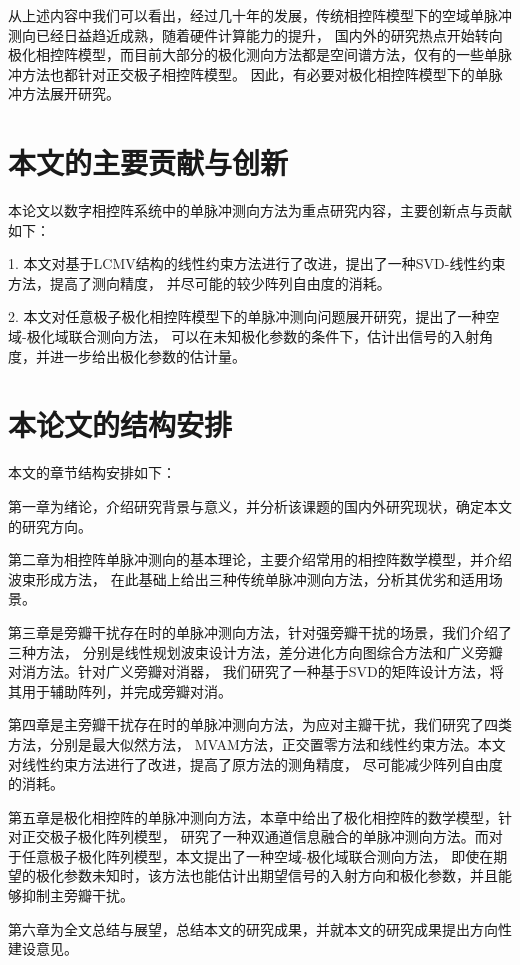 \documentclass[master]{thesis-uestc}
\begin{document}
从上述内容中我们可以看出，经过几十年的发展，传统相控阵模型下的空域单脉冲测向已经日益趋近成熟，随着硬件计算能力的提升，
国内外的研究热点开始转向极化相控阵模型，而目前大部分的极化测向方法都是空间谱方法，仅有的一些单脉冲方法也都针对正交极子相控阵模型。
因此，有必要对极化相控阵模型下的单脉冲方法展开研究。

\section{本文的主要贡献与创新}
本论文以数字相控阵系统中的单脉冲测向方法为重点研究内容，主要创新点与贡献如下：

1. 本文对基于LCMV结构的线性约束方法进行了改进，提出了一种SVD-线性约束方法，提高了测向精度，
并尽可能的较少阵列自由度的消耗。

2. 本文对任意极子极化相控阵模型下的单脉冲测向问题展开研究，提出了一种空域-极化域联合测向方法，
可以在未知极化参数的条件下，估计出信号的入射角度，并进一步给出极化参数的估计量。

\section{本论文的结构安排}
本文的章节结构安排如下：

第一章为绪论，介绍研究背景与意义，并分析该课题的国内外研究现状，确定本文的研究方向。

第二章为相控阵单脉冲测向的基本理论，主要介绍常用的相控阵数学模型，并介绍波束形成方法，
在此基础上给出三种传统单脉冲测向方法，分析其优劣和适用场景。

第三章是旁瓣干扰存在时的单脉冲测向方法，针对强旁瓣干扰的场景，我们介绍了三种方法，
分别是线性规划波束设计方法，差分进化方向图综合方法和广义旁瓣对消方法。针对广义旁瓣对消器，
我们研究了一种基于SVD的矩阵设计方法，将其用于辅助阵列，并完成旁瓣对消。

第四章是主旁瓣干扰存在时的单脉冲测向方法，为应对主瓣干扰，我们研究了四类方法，分别是最大似然方法，
MVAM方法，正交置零方法和线性约束方法。本文对线性约束方法进行了改进，提高了原方法的测角精度，
尽可能减少阵列自由度的消耗。

第五章是极化相控阵的单脉冲测向方法，本章中给出了极化相控阵的数学模型，针对正交极子极化阵列模型，
研究了一种双通道信息融合的单脉冲测向方法。而对于任意极子极化阵列模型，本文提出了一种空域-极化域联合测向方法，
即使在期望的极化参数未知时，该方法也能估计出期望信号的入射方向和极化参数，并且能够抑制主旁瓣干扰。

第六章为全文总结与展望，总结本文的研究成果，并就本文的研究成果提出方向性建设意见。
\end{document}
